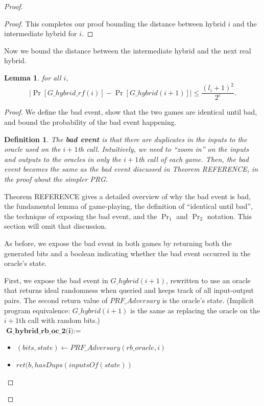 \documentclass[12pt,lot, lof]{puthesis}
\newenvironment{game}
{ \begin{itemize}[noitemsep,nolistsep] 
}
{ \end{itemize}                  }
\newcommand{\f}{\frac}
\newcommand{\lar}{\leftarrow}
\newtheorem{dfn}[thm]{Definition}
\newtheorem{lem}{Lemma}[thm]
\begin{document}
\begin{proof}
\begin{proof}
This completes our proof bounding the distance between hybrid $i$ and the intermediate hybrid for $i$.
\end{proof}

Now we bound the distance between the intermediate hybrid and the next real hybrid.

\begin{lem} for all $i$,
$$|\Pr[G\_hybrid\_rf(i)] - \Pr[G\_hybrid(i+1)] | \leq \f{(l_i + 1)^2}{2^c}.$$ \end{lem}
\begin{proof} 

We define the bad event, show that the two games are identical until bad, and bound the probability of the bad event happening.

\begin{dfn}The \textbf{bad event} is that there are duplicates in the inputs to the oracle used on the $i+1$th call. 
Intuitively, we need to ``zoom in'' on the inputs and outputs to the oracles in only the $i+1$th call of each game. Then, the bad event becomes the same as the bad event discussed in Theorem REFERENCE, in the proof about the simpler PRG.
\end{dfn} 

Theorem REFERENCE gives a detailed overview of why the bad event is bad, the fundamental lemma of game-playing, the definition of ``identical until bad'', the technique of exposing the bad event, and the $\Pr_1$ and $\Pr_2$ notation. This section will omit that discussion.

As before, we expose the bad event in both games by returning both the generated bits and a boolean indicating whether the bad event occurred in the oracle's state.

First, we expose the bad event in $G\_hybrid(i+1)$, rewritten to use an oracle that returns ideal randomness when queried and keeps track of all input-output pairs. The second return value of $PRF\_Adversary$ is the oracle's state. (Implicit program equivalence: $G\_hybrid(i+1)$ is the same as replacing the oracle on the $i+1$th call with random bits.) \\

$\textbf{G\_hybrid\_rb\_oc\_2(i)} := $
\begin{game}
\item[] $(bits, state) \lar PRF\_Adversary (rb\_oracle, i)$
\item[] $ret(b, hasDups(inputsOf(state))$ \\
\end{game}


\end{proof}
\end{proof}
\end{document}
